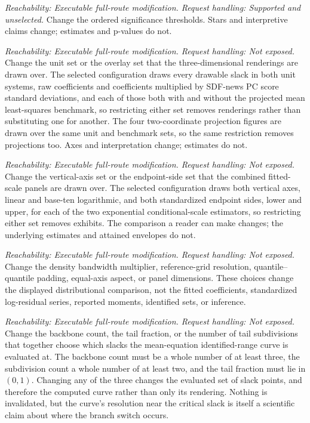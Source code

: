 \documentclass[11pt]{article}
\begin{document}
\begin{description}[style=nextline]
\item[Significance thresholds.]
\emph{Reachability: Executable full-route modification. Request handling: Supported and unselected.}
Change the ordered significance thresholds. Stars and interpretive claims change; estimates and
p-values do not.

\item[Three-dimensional rendering unit and overlay families.]
\emph{Reachability: Executable full-route modification. Request handling: Not exposed.}
Change the unit set or the overlay set that the three-dimensional renderings are drawn over. The
selected configuration draws every drawable slack in both unit systems, raw coefficients and
coefficients multiplied by SDF-news PC score standard deviations, and each of those both with and
without the projected mean least-squares benchmark, so restricting either set removes renderings
rather than substituting one for another. The four two-coordinate projection figures are drawn over
the same unit and benchmark sets, so the same restriction removes projections too. Axes and
interpretation change; estimates do not.

\item[Fitted-scale panel families.]
\emph{Reachability: Executable full-route modification. Request handling: Not exposed.}
Change the vertical-axis set or the endpoint-side set that the combined fitted-scale panels are
drawn over. The selected configuration draws both vertical axes, linear and base-ten logarithmic,
and both standardized endpoint sides, lower and upper, for each of the two exponential
conditional-scale estimators, so restricting either set removes exhibits. The comparison a reader
can make changes; the underlying estimates and attained envelopes do not.

\item[Residual-distribution figure controls.]
\emph{Reachability: Executable full-route modification. Request handling: Not exposed.}
Change the density bandwidth multiplier, reference-grid resolution,
quantile--quantile padding, equal-axis aspect, or panel dimensions. These choices
change the displayed distributional comparison, not the fitted coefficients,
standardized log-residual series, reported moments, identified sets, or
inference.

\item[Identified-range slack lattice.]
\emph{Reachability: Executable full-route modification. Request handling: Not exposed.}
Change the backbone count, the tail fraction, or the number of tail subdivisions that together
choose which slacks the mean-equation identified-range curve is evaluated at. The backbone count must be a whole
number of at least three, the subdivision count a whole number of at least two, and the tail
fraction must lie in \((0,1)\). Changing any of the three changes the evaluated set of slack points,
and therefore the computed curve rather than only its rendering. Nothing is invalidated, but the curve's resolution
near the critical slack is itself a scientific claim about where the branch switch occurs.


\end{description}
\end{document}
